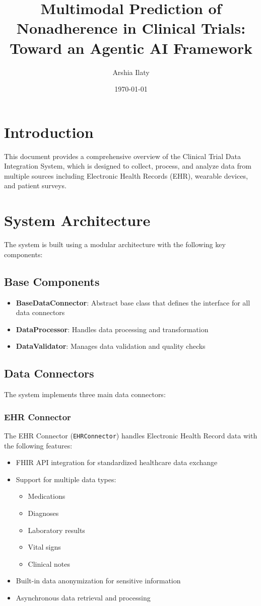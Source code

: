 \documentclass[12pt]{article}
\title{Multimodal Prediction of Nonadherence in Clinical Trials: Toward an Agentic AI Framework}
\author{Arshia Ilaty}
\date{\today}
\begin{document}
\maketitle
\tableofcontents

\section{Introduction}
This document provides a comprehensive overview of the Clinical Trial Data Integration System, which is designed to collect, process, and analyze data from multiple sources including Electronic Health Records (EHR), wearable devices, and patient surveys.

\section{System Architecture}
The system is built using a modular architecture with the following key components:

\subsection{Base Components}
\begin{itemize}
    \item \textbf{BaseDataConnector}: Abstract base class that defines the interface for all data connectors
    \item \textbf{DataProcessor}: Handles data processing and transformation
    \item \textbf{DataValidator}: Manages data validation and quality checks
\end{itemize}

\subsection{Data Connectors}
The system implements three main data connectors:

\subsubsection{EHR Connector}
The EHR Connector (\texttt{EHRConnector}) handles Electronic Health Record data with the following features:
\begin{itemize}
    \item FHIR API integration for standardized healthcare data exchange
    \item Support for multiple data types:
    \begin{itemize}
        \item Medications
        \item Diagnoses
        \item Laboratory results
        \item Vital signs
        \item Clinical notes
    \end{itemize}
    \item Built-in data anonymization for sensitive information
    \item Asynchronous data retrieval and processing
\end{itemize}
\end{document}
